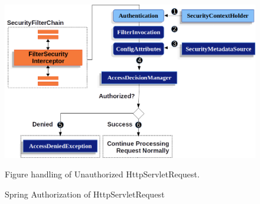 \begin{figure} 
\centering
\includegraphics[width=14cm]{pictures/spring_sec_1.png}
\caption{Spring Authorization of HttpServletRequest}
Figure handling of Unauthorized HttpServletRequest.
\label{fig:spring_sec_1}
\end{figure}








